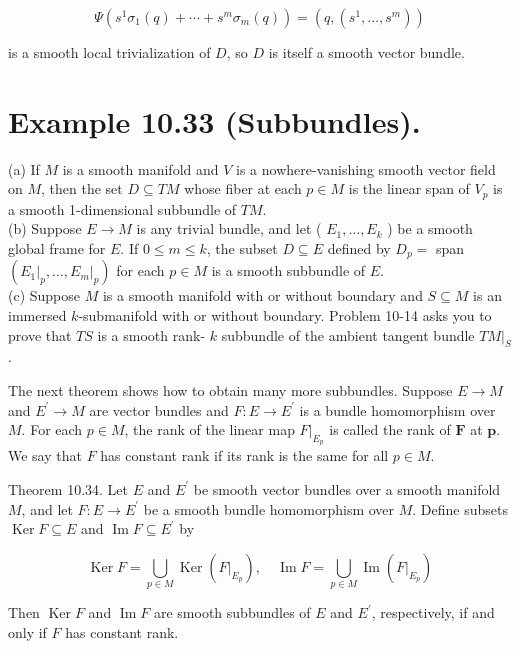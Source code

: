 \documentclass[10pt, letterpaper]{article}
\begin{document}
$$
\Psi\left(s^{1} \sigma_{1}(q)+\cdots+s^{m} \sigma_{m}(q)\right)=\left(q,\left(s^{1}, \ldots, s^{m}\right)\right)
$$

is a smooth local trivialization of $D$, so $D$ is itself a smooth vector bundle.

\section*{Example 10.33 (Subbundles).}
(a) If $M$ is a smooth manifold and $V$ is a nowhere-vanishing smooth vector field on $M$, then the set $D \subseteq T M$ whose fiber at each $p \in M$ is the linear span of $V_{p}$ is a smooth 1-dimensional subbundle of $T M$.\\
(b) Suppose $E \rightarrow M$ is any trivial bundle, and let ( $E_{1}, \ldots, E_{k}$ ) be a smooth global frame for $E$. If $0 \leq m \leq k$, the subset $D \subseteq E$ defined by $D_{p}=$ span $\left(\left.E_{1}\right|_{p}, \ldots,\left.E_{m}\right|_{p}\right)$ for each $p \in M$ is a smooth subbundle of $E$.\\
(c) Suppose $M$ is a smooth manifold with or without boundary and $S \subseteq M$ is an immersed $k$-submanifold with or without boundary. Problem 10-14 asks you to prove that $T S$ is a smooth rank- $k$ subbundle of the ambient tangent bundle $\left.T M\right|_{S}$.

The next theorem shows how to obtain many more subbundles. Suppose $E \rightarrow M$ and $E^{\prime} \rightarrow M$ are vector bundles and $F: E \rightarrow E^{\prime}$ is a bundle homomorphism over $M$. For each $p \in M$, the rank of the linear map $\left.F\right|_{E_{p}}$ is called the rank of $\boldsymbol{F}$ at $\boldsymbol{p}$. We say that $F$ has constant rank if its rank is the same for all $p \in M$.

Theorem 10.34. Let $E$ and $E^{\prime}$ be smooth vector bundles over a smooth manifold $M$, and let $F: E \rightarrow E^{\prime}$ be a smooth bundle homomorphism over $M$. Define subsets $\operatorname{Ker} F \subseteq E$ and $\operatorname{Im} F \subseteq E^{\prime}$ by

$$
\operatorname{Ker} F=\bigcup_{p \in M} \operatorname{Ker}\left(\left.F\right|_{E_{p}}\right), \quad \operatorname{Im} F=\bigcup_{p \in M} \operatorname{Im}\left(\left.F\right|_{E_{p}}\right)
$$

Then $\operatorname{Ker} F$ and $\operatorname{Im} F$ are smooth subbundles of $E$ and $E^{\prime}$, respectively, if and only if $F$ has constant rank.
\end{document}
